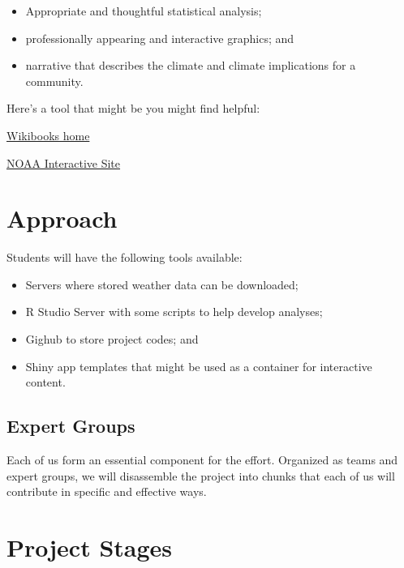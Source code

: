 \documentclass{article}\usepackage[]{graphicx}\usepackage[]{color}
\begin{document}
\begin{itemize}
  \item Appropriate and thoughtful statistical analysis;
  \item professionally appearing and interactive graphics; and 
  \item narrative that describes the climate and climate implications for a community.
\end{itemize}

Here's a tool that might be you might find helpful:

\href{http://www.wikibooks.org}{Wikibooks home}

\href{http://www.ncdc.noaa.gov/cag/}{NOAA Interactive Site}

\section{Approach}

Students will have the following tools available:

\begin{itemize}
  \item Servers where stored weather data can be downloaded;
  \item R Studio Server with some scripts to help develop analyses;
  \item Gighub to store project codes; and
  \item Shiny app templates that might be used as a container for interactive content.
\end{itemize}

\subsection{Expert Groups}

Each of us form an essential component for the effort. Organized as teams and expert groups, we will disassemble the project into chunks that each of us will contribute in specific and effective ways. 


\section{Project Stages}
\end{document}
